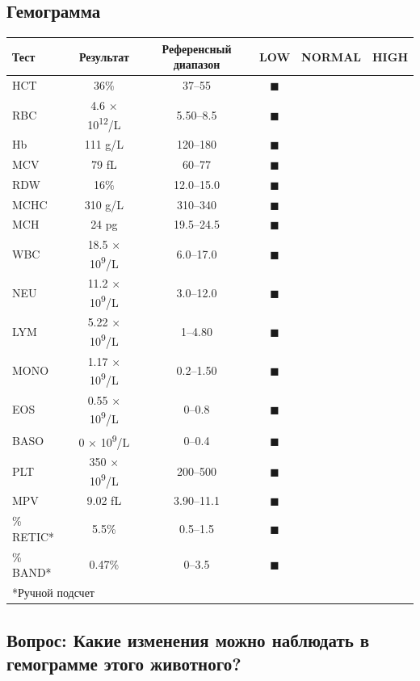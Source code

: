 \documentclass[a4paper,12pt]{book}
\begin{document}
\subsection*{Гемограмма}
\begin{tabular}{lccccc}
\toprule
Тест & Результат & Референсный диапазон & LOW & NORMAL & HIGH \\
\midrule
HCT & 36\% & 37--55 & $\blacksquare$ \\
RBC & 4.6 × 10\textsuperscript{12}/L & 5.50--8.5 & $\blacksquare$ \\
Hb & 111 g/L & 120--180 & $\blacksquare$ \\
MCV & 79 fL & 60--77 & $\blacksquare$ \\
RDW & 16\% & 12.0--15.0 & $\blacksquare$ \\
MCHC & 310 g/L & 310--340 & $\blacksquare$ \\
MCH & 24 pg & 19.5--24.5 & $\blacksquare$ \\
WBC & 18.5 × 10\textsuperscript{9}/L & 6.0--17.0 & $\blacksquare$ \\
NEU & 11.2 × 10\textsuperscript{9}/L & 3.0--12.0 & $\blacksquare$ \\
LYM & 5.22 × 10\textsuperscript{9}/L & 1--4.80 & $\blacksquare$ \\
MONO & 1.17 × 10\textsuperscript{9}/L & 0.2--1.50 & $\blacksquare$ \\
EOS & 0.55 × 10\textsuperscript{9}/L & 0--0.8 & $\blacksquare$ \\
BASO & 0 × 10\textsuperscript{9}/L & 0--0.4 & $\blacksquare$ \\
PLT & 350 × 10\textsuperscript{9}/L & 200--500 & $\blacksquare$ \\
MPV & 9.02 fL & 3.90--11.1 & $\blacksquare$ \\
\% RETIC* & 5.5\% & 0.5--1.5 & $\blacksquare$ \\
\% BAND* & 0.47\% & 0--3.5 & $\blacksquare$ \\
\bottomrule
\multicolumn{6}{l}{*Ручной подсчет}
\end{tabular}

\subsection*{Вопрос: Какие изменения можно наблюдать в гемограмме этого животного?}
\end{document}
